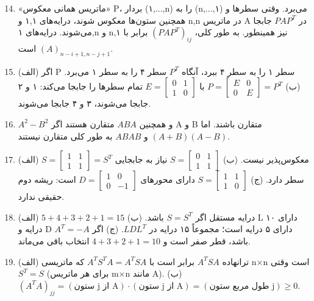 \documentclass[12pt,a4paper]{article}
\begin{document}
{		
		\begin{enumerate}
			\setcounter{enumi}{13}
			\item «ماتریس همانی معکوس» P، بردار (۱,...,n) را به (n,...,۱) می‌برد. وقتی سطرها و همچنین ستون‌ها معکوس شوند، درایه‌های ۱,۱ و n,n در ماتریس A در $PAP^T$ جابجا می‌شوند. درایه‌های ۱,n و n,۱ نیز همینطور. به طور کلی، $(PAP^T)_{ij}$ برابر با $(A)_{n-i+1, n-j+1}$ است.
			
			\item (الف) اگر P سطر ۱ را به سطر ۴ ببرد، آنگاه $P^T$ سطر ۴ را به سطر ۱ می‌برد. (ب) $P = \begin{bmatrix} E & 0 \\ 0 & E \end{bmatrix} = P^T$ با $E = \begin{bmatrix} 0 & 1 \\ 1 & 0 \end{bmatrix}$ تمام سطرها را جابجا می‌کند: ۱ و ۲ جابجا می‌شوند، ۳ و ۴ جابجا می‌شوند.
			
			\item $A^2-B^2$ و همچنین $ABA$ متقارن هستند اگر A و B متقارن باشند. اما $(A+B)(A-B)$ و $ABAB$ به طور کلی متقارن نیستند.
			
			\item (الف) $S = \begin{bmatrix} 1 & 1 \\ 1 & 1 \end{bmatrix} = S^T$ معکوس‌پذیر نیست. (ب) $S = \begin{bmatrix} 0 & 1 \\ 1 & 1 \end{bmatrix}$ نیاز به جابجایی سطر دارد. (ج) $S = \begin{bmatrix} 1 & 1 \\ 1 & 0 \end{bmatrix}$ دارای محورهای $D = \begin{bmatrix} 1 & 0 \\ 0 & -1 \end{bmatrix}$ است: ریشه دوم حقیقی ندارد.
			
			\item (الف) $5+4+3+2+1=15$ درایه مستقل اگر $S=S^T$ باشد. (ب) L دارای ۱۰ درایه و D دارای ۵ درایه است؛ مجموعاً ۱۵ درایه در $LDL^T$. (ج) اگر $A^T=-A$ باشد، قطر صفر است و $4+3+2+1=10$ انتخاب باقی می‌ماند.
			
			\item (الف) ترانهاده $A^TSA$ برابر است با $A^TS^TA = A^TSA$ که ماتریسی n×n است وقتی $S^T=S$ (برای هر ماتریس m×n مانند A). (ب) $(A^TA)_{jj} = (\text{ستون j از A}) \cdot (\text{ستون j از A}) = (\text{طول مربع ستون j}) \ge 0$.
			

\end{enumerate}}
\end{document}

